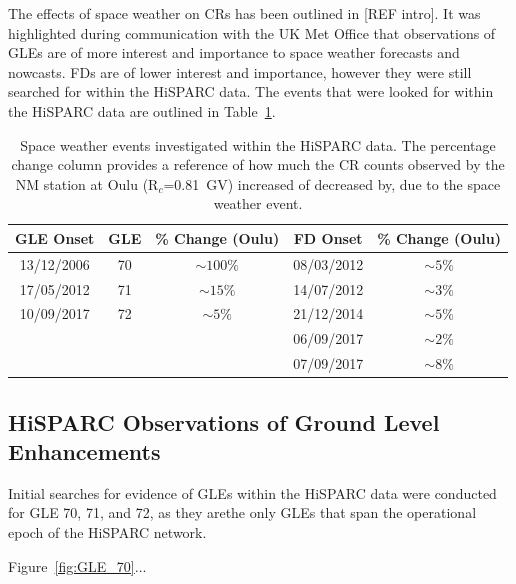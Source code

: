 The effects of space weather on CRs has been outlined in [REF intro]. It was highlighted during communication with the UK Met Office that observations of GLEs are of more interest and importance to space weather forecasts and nowcasts. FDs are of lower interest and importance, however they were still searched for within the HiSPARC data. The events that were looked for within the HiSPARC data are outlined in Table~\ref{tab:space_weather_events}.

\begin{table}
	\begin{center}
		\caption{Space weather events investigated within the HiSPARC data. The percentage change column provides a reference of how much the CR counts observed by the NM station at Oulu (R$_c$=0.81~GV) increased of decreased by, due to the space weather event.}
		\label{tab:space_weather_events}
		\begin{tabular}{c c c | c c}
		\hline
		{\bf GLE Onset} & {\bf GLE} & {\bf \% Change (Oulu)} & {\bf FD Onset} & {\bf \% Change (Oulu)}\\
		\hline
		{13/12/2006} & {70} & {$\sim 100\%$} & {08/03/2012} & {$\sim 5\%$}  \\
		{17/05/2012} & {71} & {$\sim 15\%$} & {14/07/2012} & {$\sim 3\%$} \\
		{10/09/2017} & {72} & {$\sim 5\%$} & {21/12/2014} & {$\sim 5\%$} \\
		{} & {} & {} & {06/09/2017} & {$\sim 2\%$} \\
		{} & {} & {} & {07/09/2017} & {$\sim 8\%$} \\
		\hline
		\end{tabular}
	\end{center}
\end{table}



\subsection{HiSPARC Observations of Ground Level Enhancements}

Initial searches for evidence of GLEs within the HiSPARC data were conducted for GLE 70, 71, and 72, as they arethe only GLEs that span the operational epoch of the HiSPARC network.

Figure~\ref{fig:GLE_70}...

